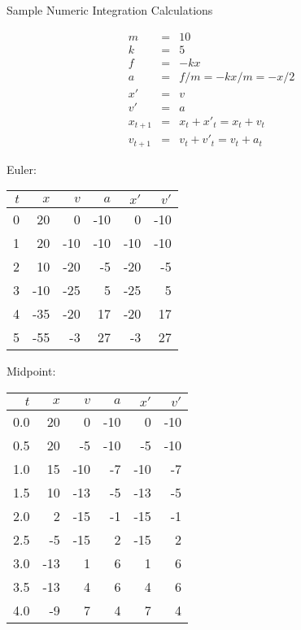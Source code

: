 \documentclass[12pt]{article}
\begin{document}
\large
\begin{center}
Sample Numeric Integration Calculations

\begin{eqnarray*}
m &=& 10  \\
k &=& 5   \\
f &=& -kx \\
a &=& f/m = -kx/m = -x/2 \\
x' &=& v \\
v' &=& a \\
x_{t+1} &=& x_{t} + x'_{t} = x_{t} + v_{t} \\
v_{t+1} &=& v_{t} + v'_{t} = v_{t} + a_{t} 
\end{eqnarray*}

Euler:\\
\begin{tabular}{r|rrr|rr}
$t$ & $x$ & $v$ & $a$ & $x'$ & $v'$ \\\hline
0 & 20 & 0 & -10 & 0 & -10 \\
1 & 20 & -10 & -10 & -10 & -10 \\
2 & 10 & -20 & -5 & -20 & -5 \\
3 & -10 & -25 & 5 & -25 & 5 \\
4 & -35 & -20 & 17 & -20 & 17 \\
5 & -55 & -3 & 27 & -3 & 27 \\
\end{tabular}


Midpoint:\\
\begin{tabular}{r|rrr|rr}
$t$ & $x$ & $v$ & $a$ & $x'$ & $v'$ \\\hline
0.0 & 20 & 0 & -10 & 0 & -10 \\
0.5 & 20 & -5 & -10 & -5 & -10 \\
1.0 & 15 & -10 & -7 & -10 & -7 \\
1.5 & 10 & -13 & -5 & -13 & -5 \\
2.0 & 2 & -15 & -1 & -15 & -1 \\
2.5 & -5 & -15 & 2 & -15 & 2 \\
3.0 & -13 & 1 & 6 & 1 & 6 \\
3.5 & -13 & 4 & 6 & 4 & 6 \\
4.0 & -9 & 7 & 4 & 7 & 4 \\
\end{tabular}

\end{center}
\end{document}
